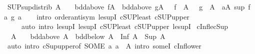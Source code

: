 \begin{isabellebody}
\ SUP{\isacharunderscore}{\kern0pt}sup{\isacharunderscore}{\kern0pt}distrib{\isacharcolon}{\kern0pt}\ {\isachardoublequoteopen}A\ {\isasymnoteq}\ {\isacharbraceleft}{\kern0pt}{\isacharbraceright}{\kern0pt}\ {\isasymLongrightarrow}\ bdd{\isacharunderscore}{\kern0pt}above\ {\isacharparenleft}{\kern0pt}f{\isacharbackquote}{\kern0pt}A{\isacharparenright}{\kern0pt}\ {\isasymLongrightarrow}\ bdd{\isacharunderscore}{\kern0pt}above\ {\isacharparenleft}{\kern0pt}g{\isacharbackquote}{\kern0pt}A{\isacharparenright}{\kern0pt}\ {\isasymLongrightarrow}\ {\isasymSqunion}\ {\isacharparenleft}{\kern0pt}f\ {\isacharbackquote}{\kern0pt}\ A{\isacharparenright}{\kern0pt}\ {\isasymsqunion}\ {\isasymSqunion}\ {\isacharparenleft}{\kern0pt}g\ {\isacharbackquote}{\kern0pt}\ A{\isacharparenright}{\kern0pt}\ {\isacharequal}{\kern0pt}\ {\isacharparenleft}{\kern0pt}{\isasymSqunion}a{\isasymin}A{\isachardot}{\kern0pt}\ sup\ {\isacharparenleft}{\kern0pt}f\ a{\isacharparenright}{\kern0pt}\ {\isacharparenleft}{\kern0pt}g\ a{\isacharparenright}{\kern0pt}{\isacharparenright}{\kern0pt}{\isachardoublequoteclose}\isanewline
%
\isadelimproof
\ \ %
\endisadelimproof
%
\isatagproof
{}\isamarkupfalse%
\ {\isacharparenleft}{\kern0pt}intro\ order{\isachardot}{\kern0pt}antisym\ le{\isacharunderscore}{\kern0pt}supI\ cSUP{\isacharunderscore}{\kern0pt}least\ cSUP{\isacharunderscore}{\kern0pt}upper{}{\isacharparenright}{\kern0pt}\isanewline
\ \ \ \ \ {\isacharparenleft}{\kern0pt}auto\ intro{\isacharcolon}{\kern0pt}\ le{\isacharunderscore}{\kern0pt}supI{}\ le{\isacharunderscore}{\kern0pt}supI{}\ cSUP{\isacharunderscore}{\kern0pt}least\ cSUP{\isacharunderscore}{\kern0pt}upper\ le{\isacharunderscore}{\kern0pt}supI{\isacharparenright}{\kern0pt}%
\endisatagproof
{\isafoldproof}%
%
\isadelimproof
\isanewline
%
\endisadelimproof
\isanewline
{}\isamarkupfalse%
\ cInf{\isacharunderscore}{\kern0pt}le{\isacharunderscore}{\kern0pt}cSup{\isacharcolon}{\kern0pt}\isanewline
\ \ {\isachardoublequoteopen}A\ {\isasymnoteq}\ {\isacharbraceleft}{\kern0pt}{\isacharbraceright}{\kern0pt}\ {\isasymLongrightarrow}\ bdd{\isacharunderscore}{\kern0pt}above\ A\ {\isasymLongrightarrow}\ bdd{\isacharunderscore}{\kern0pt}below\ A\ {\isasymLongrightarrow}\ Inf\ A\ {\isasymle}\ Sup\ A{\isachardoublequoteclose}\isanewline
%
\isadelimproof
\ \ %
\endisadelimproof
%
\isatagproof
{}\isamarkupfalse%
\ {\isacharparenleft}{\kern0pt}auto\ intro{\isacharbang}{\kern0pt}{\isacharcolon}{\kern0pt}\ cSup{\isacharunderscore}{\kern0pt}upper{}{\isacharbrackleft}{\kern0pt}of\ {\isachardoublequoteopen}SOME\ a{\isachardot}{\kern0pt}\ a\ {\isasymin}\ A{\isachardoublequoteclose}{\isacharbrackright}{\kern0pt}\ intro{\isacharcolon}{\kern0pt}\ someI\ cInf{\isacharunderscore}{\kern0pt}lower{\isacharparenright}{\kern0pt}%

\end{isabellebody}
